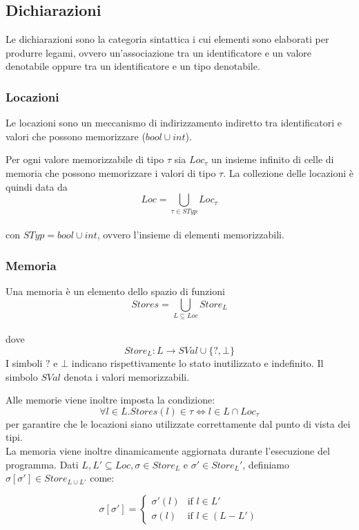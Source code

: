 \documentclass{article}[10pt]
\begin{document}
	
	\subsection{Dichiarazioni}
	Le dichiarazioni sono la categoria sintattica i cui elementi sono elaborati per produrre legami, ovvero un'associazione tra un identificatore e un valore denotabile oppure tra un identificatore e un tipo denotabile.
	
	\subsubsection{Locazioni}
	Le locazioni sono un meccanismo di indirizzamento indiretto tra identificatori e valori che possono memorizzare ($bool \cup int$).
	
	Per ogni valore memorizzabile di tipo $\tau$ sia $Loc_\tau$ un insieme infinito di celle di memoria che possono memorizzare i valori di tipo $\tau$.
	La collezione delle locazioni è quindi data da $$Loc=\bigcup\limits_{\tau\in STyp} Loc_\tau$$ \\ con $STyp=bool \cup int$, ovvero l'insieme di elementi memorizzabili.
	
	\subsubsection{Memoria}
	Una memoria è un elemento dello spazio di funzioni $$Stores=\bigcup\limits_{L\subseteq Loc} Store_L$$ \\ dove $$Store_L:L\to SVal \cup \{?, \bot\}$$
	I simboli $?$ e $\bot$ indicano rispettivamente lo stato inutilizzato e indefinito. Il simbolo $SVal$ denota i valori memorizzabili.
	
	Alle memorie viene inoltre imposta la condizione:
	$$\forall l \in L.Stores(l) \in \tau \iff l\in L\cap Loc_\tau$$ per garantire che le locazioni siano utilizzate correttamente dal punto di vista dei tipi. \\
	
	La memoria viene inoltre dinamicamente aggiornata durante l'esecuzione del programma. Dati $L,L' \subseteq Loc, \sigma \in Store_L$ e $\sigma' \in Store_L'$, definiamo $\sigma [\sigma'] \in Store_{L \cup L'}$ come:
	
	$$\sigma[\sigma'] = \begin{cases} \sigma'(l) &\mbox{if } l\in L' \\ 
		\sigma (l) & \mbox{if } l \in (L-L') \end{cases}$$ \\
	
\end{document}

